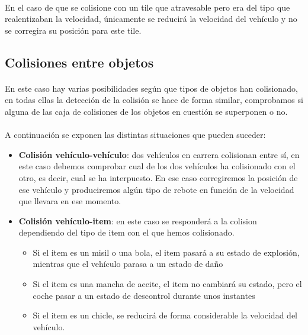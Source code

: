 \paragraph{}
En el caso de que se colisione con un tile que atravesable pero era del tipo que realentizaban la velocidad, únicamente
se reducirá la velocidad del vehículo y no se corregira su posición para este tile.


\subsection{Colisiones entre objetos}

\paragraph{}
En este caso hay varias posibilidades según que tipos de objetos han colisionado, en todas ellas la detección de la colisión
se hace de forma similar, comprobamos si alguna de las caja de colisiones de los objetos en cuestión se superponen o no.

\paragraph{}
A continuación se exponen las distintas situaciones que pueden suceder:

\begin{itemize}
    \item \textbf{Colisión vehículo-vehículo}: dos vehículos en carrera colisionan entre sí, en este caso debemos comprobar 
    cual de los dos vehículos ha colisionado con el otro, es decir, cual se ha interpuesto. En ese caso 
    corregiremos la posición de ese vehículo y produciremos algún tipo de rebote en función de la velocidad que llevara
    en ese momento.
    
    \item \textbf{Colisión vehículo-item}: en este caso se responderá a la colision dependiendo del tipo de item con el que
    hemos colisionado.
    \begin{itemize}
        \item Si el item es un misil o una bola, el item pasará a su estado de explosión, mientras que el vehículo parasa a un estado de daño
        
        \item Si el item es una mancha de aceite, el item no cambiará su estado, pero el coche pasar a un estado de descontrol durante
        unos instantes
        
        \item Si el item es un chicle, se reducirá de forma considerable la velocidad del vehículo.
    \end{itemize}
\end{itemize}

